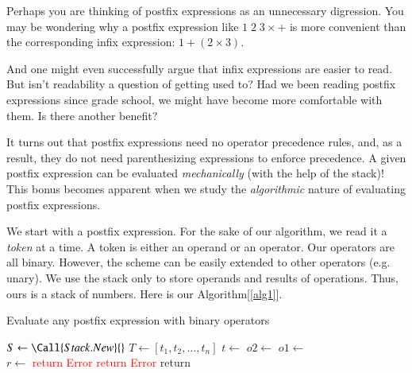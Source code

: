 \documentclass{resonance}
\begin{document}
Perhaps you are thinking of postfix expressions as an unnecessary digression. You may be wondering why a postfix expression like $1\;2\;3\times +$ is more convenient than the corresponding infix expression: $1+(2\times 3)$.

And one might even successfully argue that infix expressions are easier to read. But isn't readability a question of getting used to? Had we been reading postfix expressions since grade school, we might have become more comfortable with them. Is there another benefit? 

It turns out that postfix expressions need no operator precedence rules, and, as a result, they do not need parenthesizing expressions to enforce precedence. A given postfix expression can be evaluated \emph{mechanically} (with the help of the stack)! This bonus becomes apparent when we study the \emph{algorithmic} nature of evaluating postfix expressions. 

We start with a postfix expression. For the sake of our algorithm, we read it a \emph{token} at a time. A token is either an operand or an operator. Our operators are all binary. However, the scheme can be easily extended to other operators (e.g. unary). We use the stack only to store operands and results of operations. Thus, ours is a stack of numbers. Here is our Algorithm[\ref{alg1}].
\begin{algorithm}
\caption{Evaluate any postfix expression with binary operators}
\label{alg1}
\begin{algorithmic}[1]
  \State $S \gets \Call{Stack.New}{}$
  \State $T \gets [t_1, t_2, \dots,t_n]$
	 
	  \State $t \gets$
			\State {} \Comment{\textcolor{red}{Return Error if the stack is full}}
		 
			\State $o2 \gets$  
			\State $o1 \gets$  
			\\
			\Comment{\textcolor{red}{Return Error: not enough operands on the stack}}
			\State $r \gets$  
			\State {}\Comment{\textcolor{red}{Return Error if the stack is full}}
		\Else 
		  \State \textcolor{red}{return Error} 
		\EndIf
	\EndWhile
	  \State \textcolor{red}{return Error} 
	\Else 
	  \State return  
	\EndIf
\end{algorithmic}
\end{algorithm}
\end{document}
